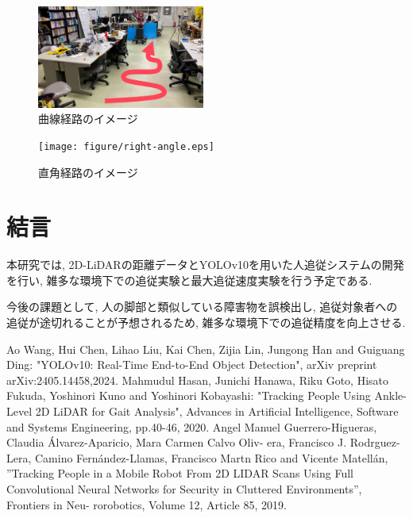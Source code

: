 \documentclass[twocolumn]{jarticle} %
\begin{document}
\begin{figure}[tb]
  \centering
  \large
  \includegraphics[width=55mm]{figure/curve.eps}
  \caption{曲線経路のイメージ}
  \label{fig:curve}
\end{figure}

\begin{figure}[tb]
  \centering
  \large
  \texttt{[image: figure/right-angle.eps]}
  \caption{直角経路のイメージ}
  \label{fig:right-angle}
\end{figure}

\section{結言}
本研究では, 2D-LiDARの距離データとYOLOv10を用いた人追従システムの開発を行い, 雑多な環境下での追従実験と最大追従速度実験を行う予定である.

今後の課題として, 人の脚部と類似している障害物を誤検出し, 追従対象者への追従が途切れることが予想されるため, 雑多な環境下での追従精度を向上させる.




\small
\begin{thebibliography}{9}

  Ao Wang, Hui Chen, Lihao Liu, Kai Chen, Zijia Lin, Jungong Han and Guiguang Ding: "YOLOv10: Real-Time End-to-End Object Detection", arXiv preprint arXiv:2405.14458,2024.
  Mahmudul Hasan, Junichi Hanawa, Riku Goto, Hisato Fukuda, Yoshinori Kuno and Yoshinori Kobayashi: "Tracking People Using Ankle-Level 2D LiDAR for Gait Analysis", Advances in Artificial Intelligence, Software and Systems Engineering, pp.40-46, 2020.
  Angel Manuel Guerrero-Higueras, Claudia Álvarez-Aparicio, Mara Carmen Calvo Oliv-
era, Francisco J. Rodrguez-Lera, Camino Fernández-Llamas, Francisco Martn Rico and
Vicente Matellán, ”Tracking People in a Mobile Robot From 2D LIDAR Scans Using Full
Convolutional Neural Networks for Security in Cluttered Environments”, Frontiers in Neu-
rorobotics, Volume 12, Article 85, 2019.
\end{thebibliography}
\end{document}
